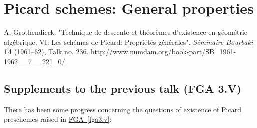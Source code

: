 \part{Picard schemes: General properties}\label{fga3.vi}\thispagestyle{fancy}\begin{original}{}\label{fga3.vi-original-citation}\skipsinglepar\par{}A. Grothendieck.
    "Technique de descente et théorèmes d'existence en géométrie algébrique, VI: Les schémas de Picard: Propriétés générales".
    \emph{Séminaire Bourbaki} \textbf{14} (1961–62), Talk no. 236.
    \url{http://www.numdam.org/book-part/SB_1961-1962__7__221_0/}\end{original}\chapter{Supplements to the previous talk (FGA 3.V)}\thispagestyle{fancy}\label{fga3.vi-0}\par{}There has been some progress concerning the questions of existence of Picard preschemes raised in \hyperref[fga3.v]{FGA~\ref*{fga3.v}}:
  
